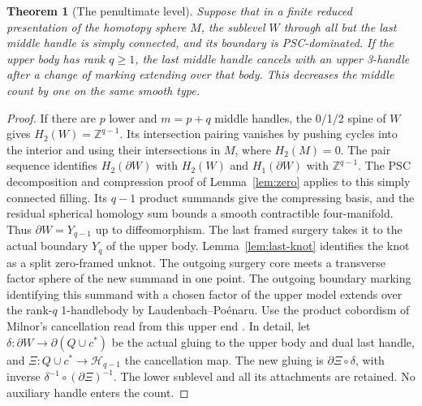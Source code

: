 \documentclass[11pt,letterpaper]{article}
\numberwithin{equation}{section}
\newtheorem{theorem}{Theorem}[section]
\theoremstyle{remark}
\newcommand{\HB}[1]{\mathcal H_{#1}}
\begin{document}
\begin{theorem}[The penultimate level]\label{thm:last}
Suppose that in a finite reduced presentation of the homotopy sphere
\(M\), the sublevel \(W\) through all but the last middle handle is
simply connected, and its boundary is PSC-dominated. If the upper
body has rank \(q\ge1\), the last middle handle cancels with an
upper 3-handle after a change of marking extending over that body.
This decreases the middle count by one on the same smooth type.
\end{theorem}
\begin{proof}
If there are \(p\) lower and \(m=p+q\) middle handles, the
0/1/2 spine of \(W\) gives \(H_2(W)=\mathbb Z^{q-1}\).
Its intersection pairing vanishes by pushing cycles into the
interior and using their intersections in \(M\), where \(H_2(M)=0\).
The pair sequence identifies \(H_2(\partial W)\) with \(H_2(W)\)
and \(H_1(\partial W)\) with \(\mathbb Z^{q-1}\). The PSC decomposition
and compression proof of Lemma~\ref{lem:zero} applies to this
simply connected filling. Its \(q-1\) product summands give the
compressing basis, and the residual spherical homology sum bounds
a smooth contractible four-manifold. Thus \(\partial W=Y_{q-1}\)
up to diffeomorphism. The last framed surgery takes it to the
actual boundary \(Y_q\) of the upper body. Lemma~\ref{lem:last-knot}
identifies the knot as a split zero-framed unknot. The outgoing
surgery core meets a transverse factor sphere of the new summand
in one point. The outgoing boundary marking identifying this
summand with a chosen factor of the upper model extends over the
rank-\(q\) 1-handlebody by Laudenbach--Po\'enaru. Use the product
cobordism of Milnor's cancellation read from this upper end
\cite{LaudenbachPoenaru1972Handlebodies,Milnor1965HCobordism}.
In detail, let \(\delta:\partial W\to\partial(Q\cup c^*)\)
be the actual gluing to the upper body and dual last handle, and
\(\Xi:Q\cup c^*\to\HB{q-1}\) the cancellation map. The new
gluing is \(\partial\Xi\circ\delta\), with inverse
\(\delta^{-1}\circ(\partial\Xi)^{-1}\). The lower sublevel and all
its attachments are retained. No auxiliary handle enters the count.
\end{proof}
\end{document}
